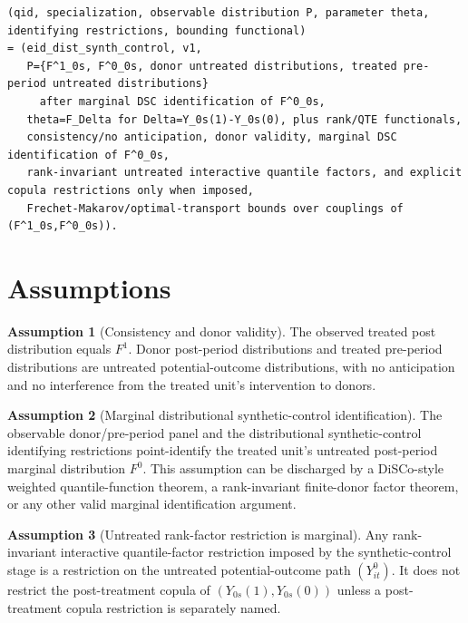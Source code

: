 \documentclass[11pt]{article}
\theoremstyle{definition}
\newtheorem{assumption}{Assumption}
\theoremstyle{plain}
\theoremstyle{remark}
\begin{document}
\begin{verbatim}
(qid, specialization, observable distribution P, parameter theta, identifying restrictions, bounding functional)
= (eid_dist_synth_control, v1,
   P={F^1_0s, F^0_0s, donor untreated distributions, treated pre-period untreated distributions}
     after marginal DSC identification of F^0_0s,
   theta=F_Delta for Delta=Y_0s(1)-Y_0s(0), plus rank/QTE functionals,
   consistency/no anticipation, donor validity, marginal DSC identification of F^0_0s,
   rank-invariant untreated interactive quantile factors, and explicit copula restrictions only when imposed,
   Frechet-Makarov/optimal-transport bounds over couplings of (F^1_0s,F^0_0s)).
\end{verbatim}

\section{Assumptions}
\begin{assumption}[Consistency and donor validity]\label{ass:consistency}
The observed treated post distribution equals \(F^1\).  Donor post-period distributions and treated pre-period distributions are untreated potential-outcome distributions, with no anticipation and no interference from the treated unit's intervention to donors.
\end{assumption}

\begin{assumption}[Marginal distributional synthetic-control identification]\label{ass:marginal-id}
The observable donor/pre-period panel and the distributional synthetic-control identifying restrictions point-identify the treated unit's untreated post-period marginal distribution \(F^0\).  This assumption can be discharged by a DiSCo-style weighted quantile-function theorem, a rank-invariant finite-donor factor theorem, or any other valid marginal identification argument.
\end{assumption}

\begin{assumption}[Untreated rank-factor restriction is marginal]\label{ass:untreated-only}
Any rank-invariant interactive quantile-factor restriction imposed by the synthetic-control stage is a restriction on the untreated potential-outcome path \((Y^0_{it})\).  It does not restrict the post-treatment copula of \((Y_{0s}(1),Y_{0s}(0))\) unless a post-treatment copula restriction is separately named.
\end{assumption}
\end{document}
